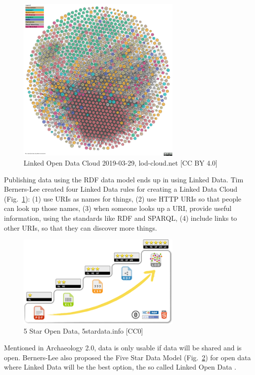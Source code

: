 \documentclass[twocolumn]{autart}
\begin{document}
\begin{figure}[!htb]
\begin{center}
\includegraphics[width=8cm]{lod-cloud.pdf}
\caption{Linked Open Data Cloud 2019-03-29, lod-cloud.net [CC BY 4.0]}
\label{figlodc}
\end{center}
\end{figure}

Publishing data using the RDF data model ends up in using Linked Data. Tim Berners-Lee created four Linked Data rules \cite{bernerslee_linkeddata} for creating a Linked Data Cloud (Fig.~\ref{figlodc}): (1) use URIs as names for things, (2) use HTTP URIs so that people can look up those names, (3) when someone looks up a URI, provide useful information, using the standards like RDF and SPARQL, (4) include links to other URIs, so that they can discover more things.

\begin{figure}[!htb]
\begin{center}
\includegraphics[width=8cm]{5-star-steps.png}
\caption{5 Star Open Data, 5stardata.info [CC0]}
\label{figfivestar}
\end{center}
\end{figure}

Mentioned in Archaeology 2.0, data is only usable if data will be shared and is open. Berners-Lee also proposed the Five Star Data Model (Fig.~\ref{figfivestar}) for open data where Linked Data will be the best option, the so called Linked Open Data \cite{hausenblas_5star}.
\end{document}
